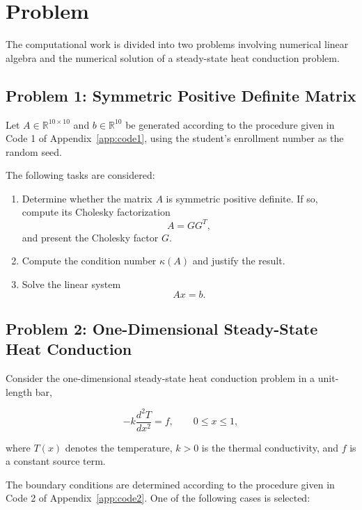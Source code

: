 \section{Problem}

The computational work is divided into two problems involving numerical linear
algebra and the numerical solution of a steady-state heat conduction problem.

\subsection{Problem 1: Symmetric Positive Definite Matrix}

Let $A \in \mathbb{R}^{10\times10}$ and $b \in \mathbb{R}^{10}$ be generated
according to the procedure given in Code 1 of Appendix~\ref{app:code1}, using
the student's enrollment number as the random seed.

The following tasks are considered:

\begin{enumerate}
    \item Determine whether the matrix $A$ is symmetric positive definite.
          If so, compute its Cholesky factorization
          \[
              A = GG^{T},
          \]
          and present the Cholesky factor $G$.

    \item Compute the condition number $\kappa(A)$ and justify the result.

    \item Solve the linear system
          \[
              Ax=b.
          \]
\end{enumerate}

\subsection{Problem 2: One-Dimensional Steady-State Heat Conduction}

Consider the one-dimensional steady-state heat conduction problem in a unit-length bar,

\begin{equation}
    -k\frac{d^2T}{dx^2}=f,
    \qquad 0\leq x\leq1,
\end{equation}

where $T(x)$ denotes the temperature, $k>0$ is the thermal conductivity,
and $f$ is a constant source term.

The boundary conditions are determined according to the procedure given in Code 2
of Appendix~\ref{app:code2}. One of the following cases is selected:

